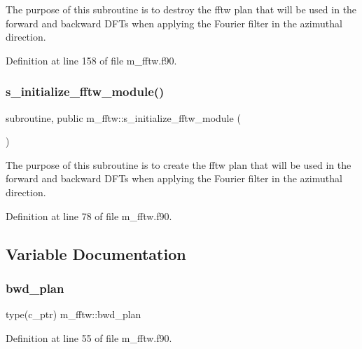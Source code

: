 The purpose of this subroutine is to destroy the fftw plan that will be used in the forward and backward D\+F\+Ts when applying the Fourier filter in the azimuthal direction. 



Definition at line 158 of file m\+\_\+fftw.\+f90.

\mbox{\label{namespacem__fftw_a6f924722e9573d6526d5d1ba173f4ac6}} 
\subsubsection{\texorpdfstring{s\+\_\+initialize\+\_\+fftw\+\_\+module()}{s\_initialize\_fftw\_module()}}
{\footnotesize\ttfamily subroutine, public m\+\_\+fftw\+::s\+\_\+initialize\+\_\+fftw\+\_\+module (\begin{DoxyParamCaption}{ }\end{DoxyParamCaption})}



The purpose of this subroutine is to create the fftw plan that will be used in the forward and backward D\+F\+Ts when applying the Fourier filter in the azimuthal direction. 



Definition at line 78 of file m\+\_\+fftw.\+f90.



\subsection{Variable Documentation}
\mbox{\label{namespacem__fftw_a5120d0924ad190de0c0967cfdfdffb64}} 
\subsubsection{\texorpdfstring{bwd\+\_\+plan}{bwd\_plan}}
{\footnotesize\ttfamily type(c\+\_\+ptr) m\+\_\+fftw\+::bwd\+\_\+plan}



Definition at line 55 of file m\+\_\+fftw.\+f90.


